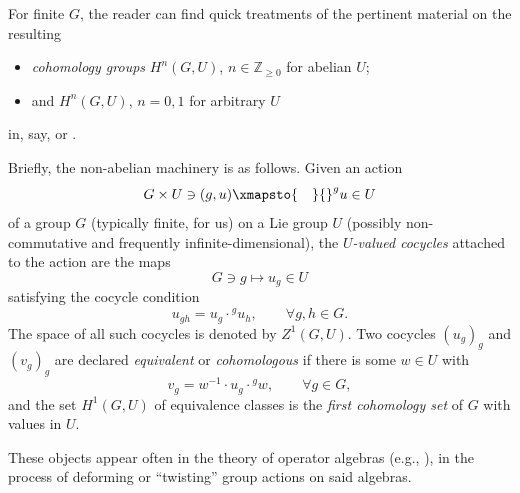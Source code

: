 \documentclass[pdftex]{sigma}
\numberwithin{equation}{section}
\newcommand\bZ{{\mathbb Z}}
\begin{document}
For finite $G$, the reader can find quick treatments of the pertinent material on the resulting
\begin{itemize}\itemsep=0pt
\item {\it cohomology groups} $H^n(G,U)$, $n\in \bZ_{\ge 0}$ for abelian $U$;
\item and $H^n(G,U)$, $n=0,1$ for arbitrary $U$
\end{itemize}
in, say, \cite[Chapter VII and its Appendix]{ser-lf} or \cite[Sections~I.2 and I.5]{ser-gal}.

Briefly, the non-abelian machinery is as follows. Given an action
\begin{equation}\label{eq:gactu}
 G\times U\ni (g,u)\xmapsto{\quad} {}^gu\in U
\end{equation}
of a group $G$ (typically finite, for us) on a Lie group $U$ (possibly non-commutative and frequently infinite-dimensional), the {\it $U$-valued cocycles} attached to the action are the maps
\begin{equation}\label{eq:gtoug}
 G\ni g\mapsto u_g\in U
\end{equation}
satisfying the cocycle condition
\begin{equation}\label{eq:cocyccond}
 u_{gh} = u_g\cdot {}^g u_h,\qquad \forall g,h\in G.
\end{equation}
The space of all such cocycles is denoted by $Z^1(G,U)$. Two cocycles $(u_g)_g$ and $(v_g)_g$ are declared {\it equivalent} or {\it cohomologous} if there is some $w\in U$ with
\begin{equation*}
 v_g = w^{-1}\cdot u_g\cdot {}^g w,\qquad \forall g\in G,
\end{equation*}
and the set $H^1(G,U)$ of equivalence classes is the {\it first cohomology set} of $G$ with values in $U$.

These objects appear often in the theory of operator algebras (e.g., \cite[Definition X.1.4]{tak2}), in the process of deforming or ``twisting'' group actions on said algebras.
\end{document}
